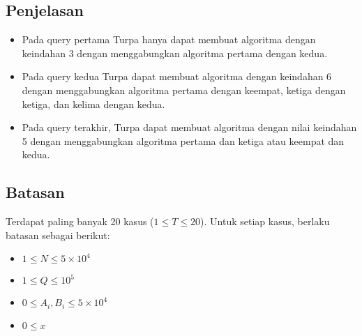 \documentclass{article}
\begin{document}
\subsection*{Penjelasan}
\begin{itemize}
\item Pada query pertama Turpa hanya dapat membuat algoritma dengan keindahan 3 dengan menggabungkan algoritma pertama dengan kedua.
\item Pada query kedua Turpa dapat membuat algoritma dengan keindahan 6 dengan menggabungkan algoritma pertama dengan keempat, ketiga dengan ketiga, dan kelima dengan kedua.
\item Pada query terakhir, Turpa dapat membuat algoritma dengan nilai keindahan 5 dengan menggabungkan algoritma pertama dan ketiga atau keempat dan kedua.
\end{itemize}
\subsection*{Batasan}

\par Terdapat paling banyak 20 kasus ($1 \leq T \leq 20$). Untuk setiap kasus, berlaku batasan sebagai berikut:
\begin{itemize}
	\item $1 \leq N \leq 5\times 10^4$
	\item $1 \leq Q \leq 10^5$
	\item $0 \leq A_i,B_i \leq 5\times 10^4$
	\item $0 \leq x$
\end{itemize}
\end{document}
